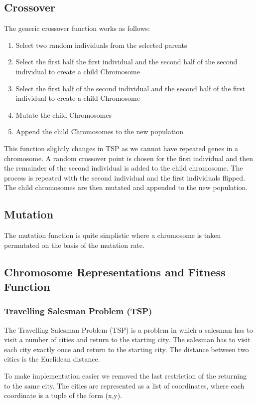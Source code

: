 \documentclass[11pt, letterpaper]{article}
\begin{document}
\subsection{Crossover}
The generic crossover function works as follows:
\begin{enumerate}
    \item Select two random individuals from the selected parents
    \item Select the first half the first individual and the second half of the second individual to create a child Chromosome
    \item Select the first half of the second individual and the second half of the first individual to create a child Chromosome
    \item Mutate the child Chromosomes
    \item Append the child Chromosomes to the new population
\end{enumerate}
This function slightly changes in TSP as we cannot have repeated genes in a chromosome. A random crossover point is chosen for the first individual and then the remainder of the second individual is added to the child chromosome. The process is repeated with the second individual and the first individuals flipped. The child chromosomes are then mutated and appended to the new population.
\subsection{Mutation}
The mutation function is quite simplistic where a chromosome is taken permutated on the basis of the mutation rate.
\subsection{Chromosome Representations and Fitness Function}
\subsubsection{Travelling Salesman Problem (TSP)}
The Travelling Salesman Problem (TSP) is a problem in which a salesman has to visit a number of cities and return to the starting city. The salesman has to visit each city exactly once and return to the starting city. The distance between two cities is the Euclidean distance. 

To make implementation easier we removed the last restriction of the returning to the same city. The cities are represented as a list of coordinates, where each coordinate is a tuple of the form (x,y). 
\end{document}
